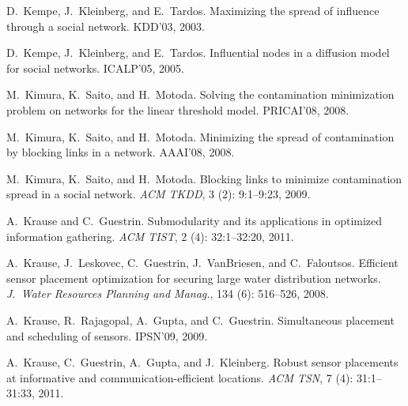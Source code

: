 \begin{thebibliography}{41}
D.~Kempe, J.~Kleinberg, and E.~Tardos.
\newblock Maximizing the spread of influence through a social network.
\newblock KDD'03, 2003.

D.~Kempe, J.~Kleinberg, and E.~Tardos.
\newblock Influential nodes in a diffusion model for social networks.
\newblock ICALP'05, 2005.

M.~Kimura, K.~Saito, and H.~Motoda.
\newblock Solving the contamination minimization problem on networks for the
  linear threshold model.
\newblock PRICAI'08, 2008.

M.~Kimura, K.~Saito, and H.~Motoda.
\newblock Minimizing the spread of contamination by blocking links in a
  network.
\newblock AAAI'08, 2008.

M.~Kimura, K.~Saito, and H.~Motoda.
\newblock Blocking links to minimize contamination spread in a social network.
\newblock \emph{ACM TKDD}, 3 (2): 9:1--9:23, 2009.

A.~Krause and C.~Guestrin.
\newblock Submodularity and its applications in optimized information
  gathering.
\newblock \emph{ACM TIST}, 2 (4):
  32:1--32:20, 2011.

A.~Krause, J.~Leskovec, C.~Guestrin, J.~VanBriesen, and C.~Faloutsos.
\newblock Efficient sensor placement optimization for securing large water
  distribution networks.
\newblock \emph{J.~Water Resources Planning and Manag.},
  134 (6): 516--526, 2008.

A.~Krause, R.~Rajagopal, A.~Gupta, and C.~Guestrin.
\newblock Simultaneous placement and scheduling of sensors.
\newblock IPSN'09, 2009.

A.~Krause, C.~Guestrin, A.~Gupta, and J.~Kleinberg.
\newblock Robust sensor placements at informative and communication-efficient
  locations.
\newblock \emph{ACM TSN}, 7 (4): 31:1--31:33, 2011.


\end{thebibliography}
